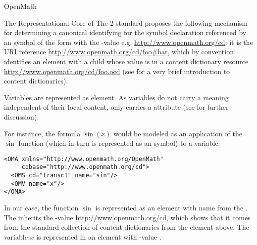 \begin{omgroup}[id=mobj,short=Mathematical Objects]
\begin{omgroup}[id=openmath]{OpenMath}
\begin{module}[id=OpenMath]
\begin{omgroup}[id=om.core]{The Representational Core of {\openmath}}
The {\openmath}2 standard proposes the following mechanism for determining a canonical
identifying {} for the symbol declaration referenced by an {\openmath}
symbol of the form {} with the
{}-value e.g.  \url{http://www.openmath.org/cd}: it is the URI
reference \url{http://www.openmath.org/cd/foo#bar}, which by convention identifies an
{} element with a child {}
whose value is {} in a content dictionary resource
\url{http://www.openmath.org/cd/foo.ocd} (see {} for a
very brief introduction to {\openmath} content dictionaries). 

Variables are represented as {} element.  As variables do not
carry a meaning independent of their local content, {} only
carries a {} attribute (see {} for
further discussion).

For instance, the formula $\sin(x)$ would be modeled as an application of the
$\sin$ function (which in turn is represented as an {\openmath} symbol) to a
variable:
\begin{lstlisting}[label=sinx,language=OpenMath,numbers=none,
   index={OMA,OMV,OMS}]
<OMA xmlns="http://www.openmath.org/OpenMath"
     cdbase="http://www.openmath.org/cd">
  <OMS cd="transc1" name="sin"/>
  <OMV name="x"/>
</OMA>
\end{lstlisting}

In our case, the function $\sin$ is represented as an {} element
with name {} from the {}
{}. The {} inherits the
{}-value \url{http://www.openmath.org/cd}, which shows that it
comes from the {\openmath} standard collection of content dictionaries from the
{} element above.  The variable $x$ is represented
in an {} element with {}-value
{}.


\end{omgroup}
\end{module}
\end{omgroup}
\end{omgroup}
